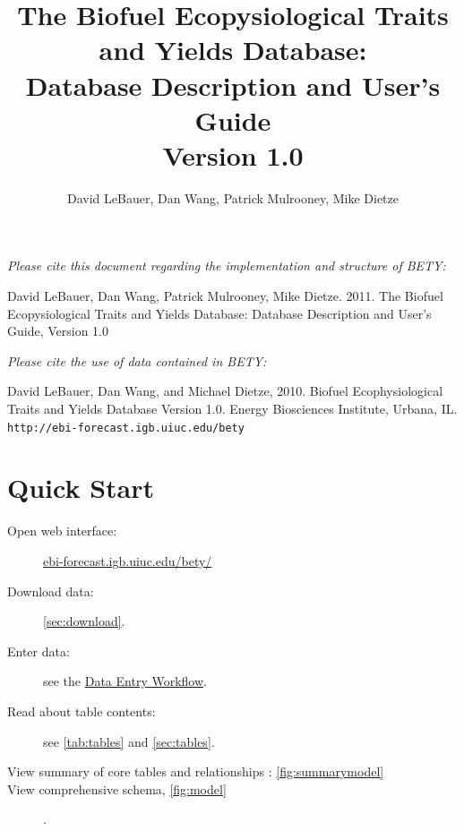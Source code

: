\documentclass[10pt]{article}
\date{}
\title{The Biofuel Ecopysiological Traits and Yields Database:\\ Database Description and User's Guide\\Version 1.0}
\author{David LeBauer, Dan Wang, Patrick Mulrooney, Mike Dietze}
\begin{document}
\maketitle 
\vspace{5in}
\noindent \textit{Please cite this document regarding the implementation and structure of BETY:}

David LeBauer, Dan Wang, Patrick Mulrooney, Mike Dietze. 2011. The Biofuel Ecopysiological Traits and Yields Database: Database Description and User’s Guide, Version 1.0
\vspace{1em}

\noindent \textit{Please cite the use of data contained in BETY:}

 David LeBauer, Dan Wang, and Michael Dietze, 2010. Biofuel Ecophysiological Traits and Yields Database Version 1.0. Energy Biosciences Institute, Urbana, IL. \texttt{http://ebi-forecast.igb.uiuc.edu/bety}

\newpage
\tableofcontents
\newpage
\listoftables
\listoffigures

\newpage
\section{Quick Start}
\begin{description}
\item[Open web interface:] \href{http://ebi-forecast.igb.uiuc.edu/bety/}{ebi-forecast.igb.uiuc.edu/bety/}
\item[Download data:] \autoref{sec:download}.
\item[Enter data:] see the \href{https://netfiles.uiuc.edu/dlebauer/www/dbdocumentation_data_entry.pdf}{Data Entry Workflow}.  
\item[Read about table contents:] see \autoref{tab:tables} and \autoref{sec:tables}.
\item[View summary of core tables and relationships : \autoref{fig:summarymodel}]
\item[View comprehensive schema, \autoref{fig:model}].
\end{description}
  
\end{document}
